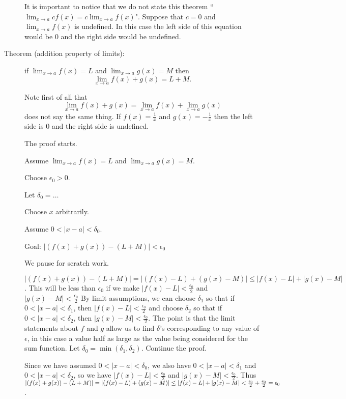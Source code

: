 \documentclass[12pt]{article}
\begin{document}
\begin{description}
It is important to notice that we do not state this theorem ``$\lim_{x\rightarrow a}cf(x)=c\lim_{x\rightarrow a} f(x)$".
Suppose that $c=0$ and $\lim_{x\rightarrow a}f(x)$ is undefined.  In this case the left side of this equation would be 0
and the right side would be undefined.

\item[Theorem (addition property of limits):]  if $\lim_{x \rightarrow a} f(x)=L$ and $\lim_{x \rightarrow a}g(x)=M$ then
$$\lim_{x \rightarrow a} f(x)+g(x) = L+M.$$

Note first of all that $$\lim_{x \rightarrow a} f(x)+g(x) = \lim_{x \rightarrow a}f(x)+\lim_{x \rightarrow a}g(x)$$ does not say the same thing.  If $f(x)=\frac 1x$ and $g(x)=-\frac 1x$ then the left side is 0 and the right side is undefined.

The proof starts.

Assume $\lim_{x \rightarrow a} f(x)=L$ and $\lim_{x \rightarrow a}g(x)=M$.

Choose $\epsilon_0>0$.

Let $\delta_0=\ldots$

Choose $x$ arbitrarily.

Assume $0<|x-a|<\delta_0$.

Goal:  $|(f(x)+g(x))-(L+M)|<\epsilon_0$

We pause for scratch work.

$|(f(x)+g(x))-(L+M)| = |(f(x)-L) + (g(x)-M)| \leq |f(x)-L| + |g(x)-M|$.  This will be less than $\epsilon_0$
if we make  $|f(x)-L|<\frac{\epsilon_0}2$ and $|g(x)-M|<\frac{\epsilon_0}2$  By limit assumptions, we can
choose $\delta_1$ so that if $0<|x-a|<\delta_1$, then $|f(x)-L|<\frac{\epsilon_0}2$  and choose $\delta_2$ so that if $0<|x-a|<\delta_2$, then $|g(x)-M|<\frac{\epsilon_0}2$.  The point is that the limit statements about $f$ and $g$
allow us to find $\delta$'s corresponding to any value of $\epsilon$, in this case a value half as large as the value being considered for the sum function.  Let $\delta_0 = \min(\delta_1,\delta_2)$.  Continue the proof.

Since we have assumed $0<|x-a|<\delta_0$, we also have $0<|x-a|<\delta_1$ and $0<|x-a|<\delta_2$, so
we have $|f(x)-L|<\frac{\epsilon_0}2$ and $|g(x)-M|<\frac{\epsilon_0}2$.  Thus $|(f(x)+g(x))-(L+M)| = |(f(x)-L)+(g(x)-M)| \newline \leq |f(x)-L| + |g(x)-M| < \frac{\epsilon_0}2 +\frac{\epsilon_0}2 = \epsilon_0$.


\end{description}
\end{document}
